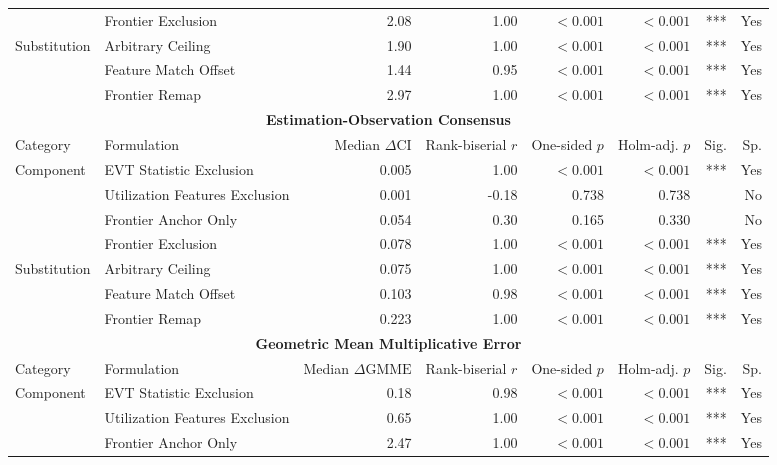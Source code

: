 \documentclass{article}
\begin{document}
\begin{table}[H]
\begin{tabularx}{\linewidth}{@{}l>{\raggedright\arraybackslash}Xrrrrrr@{}}
 & Frontier Exclusion & 2.08 & 1.00 & $<0.001$ & $<0.001$ & *** & Yes \\
\addlinespace
Substitution & Arbitrary Ceiling & 1.90 & 1.00 & $<0.001$ & $<0.001$ & *** & Yes \\
 & Feature Match Offset & 1.44 & 0.95 & $<0.001$ & $<0.001$ & *** & Yes \\
 & Frontier Remap & 2.97 & 1.00 & $<0.001$ & $<0.001$ & *** & Yes \\
\midrule
\multicolumn{8}{c}{\textbf{Estimation-Observation Consensus}} \\
\cmidrule(lr){1-8}
Category & Formulation & \shortstack{Median\\$\Delta\mathrm{CI}$} & \shortstack{Rank-biserial\\$r$} & \shortstack{One-sided\\$p$} & \shortstack{Holm-adj.\\$p$} & Sig. & Sp. \\
\midrule
Component & EVT Statistic Exclusion & 0.005 & 1.00 & $<0.001$ & $<0.001$ & *** & Yes \\
 & Utilization Features Exclusion & 0.001 & -0.18 & 0.738 & 0.738 &  & No \\
 & Frontier Anchor Only & 0.054 & 0.30 & 0.165 & 0.330 &  & No \\
 & Frontier Exclusion & 0.078 & 1.00 & $<0.001$ & $<0.001$ & *** & Yes \\
\addlinespace
Substitution & Arbitrary Ceiling & 0.075 & 1.00 & $<0.001$ & $<0.001$ & *** & Yes \\
 & Feature Match Offset & 0.103 & 0.98 & $<0.001$ & $<0.001$ & *** & Yes \\
 & Frontier Remap & 0.223 & 1.00 & $<0.001$ & $<0.001$ & *** & Yes \\
\midrule
\multicolumn{8}{c}{\textbf{Geometric Mean Multiplicative Error}} \\
\cmidrule(lr){1-8}
Category & Formulation & \shortstack{Median\\$\Delta\mathrm{GMME}$} & \shortstack{Rank-biserial\\$r$} & \shortstack{One-sided\\$p$} & \shortstack{Holm-adj.\\$p$} & Sig. & Sp. \\
\midrule
Component & EVT Statistic Exclusion & 0.18 & 0.98 & $<0.001$ & $<0.001$ & *** & Yes \\
 & Utilization Features Exclusion & 0.65 & 1.00 & $<0.001$ & $<0.001$ & *** & Yes \\
 & Frontier Anchor Only & 2.47 & 1.00 & $<0.001$ & $<0.001$ & *** & Yes \\

\end{tabularx}
\end{table}
\end{document}
